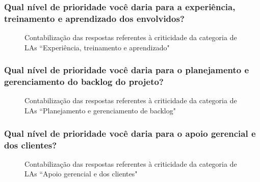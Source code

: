 \subsubsection{Qual nível de prioridade você daria para a experiência, treinamento e aprendizado dos envolvidos?}

\begin{figure}[H]
	\centering
	\captionsetup{justification=centering}
	\caption{Contabilização das respostas referentes à criticidade da categoria de LAs ``Experiência, treinamento e aprendizado"}
	\label{fig:result-exp}
\end{figure}


\subsubsection{Qual nível de prioridade você daria para o planejamento e gerenciamento do backlog do projeto?}

\begin{figure}[H]
	\centering
	\captionsetup{justification=centering}
	\caption{Contabilização das respostas referentes à criticidade da categoria de LAs ``Planejamento e gerenciamento de backlog"}
	\label{fig:result-backlog}
\end{figure}

\subsubsection{Qual nível de prioridade você daria para o apoio gerencial e dos clientes?}

\begin{figure}[H]
	\centering
	\captionsetup{justification=centering}
	\caption{Contabilização das respostas referentes à criticidade da categoria de LAs ``Apoio gerencial e dos clientes"}
	\label{fig:result-apoio}
\end{figure}

